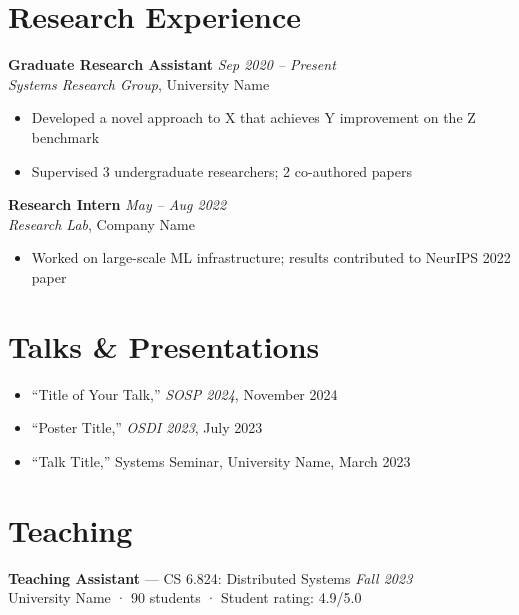 \documentclass[11pt, a4paper]{article}
\begin{document}
\section{Research Experience}

\noindent\textbf{Graduate Research Assistant} \hfill \textit{Sep 2020 -- Present}\\
\textit{Systems Research Group}, University Name\\
\begin{itemize}[leftmargin=*, noitemsep, topsep=3pt]
  \item Developed a novel approach to X that achieves Y improvement on the Z benchmark
  \item Supervised 3 undergraduate researchers; 2 co-authored papers
\end{itemize}

\vspace{5pt}
\noindent\textbf{Research Intern} \hfill \textit{May -- Aug 2022}\\
\textit{Research Lab}, Company Name\\
\begin{itemize}[leftmargin=*, noitemsep, topsep=3pt]
  \item Worked on large-scale ML infrastructure; results contributed to NeurIPS 2022 paper
\end{itemize}

\section{Talks \& Presentations}

\begin{itemize}[leftmargin=*, noitemsep, topsep=2pt]
  \item ``Title of Your Talk,'' \textit{SOSP 2024}, November 2024
  \item ``Poster Title,'' \textit{OSDI 2023}, July 2023
  \item ``Talk Title,'' Systems Seminar, University Name, March 2023
\end{itemize}

\section{Teaching}

\noindent\textbf{Teaching Assistant} — CS 6.824: Distributed Systems \hfill \textit{Fall 2023}\\
University Name · 90 students · Student rating: 4.9/5.0
\end{document}
